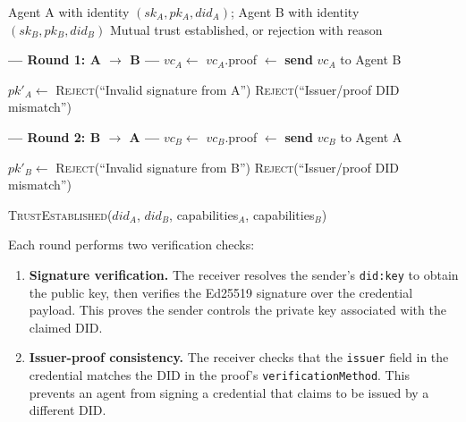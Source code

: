 \documentclass[11pt]{article}
\newcommand{\didkey}{\texttt{did:key}}
\begin{document}
\begin{algorithm}[t]
\caption{Mutual Trust Handshake}
\label{alg:handshake}
\begin{algorithmic}[1]
\Require Agent A with identity $(sk_A, pk_A, did_A)$; Agent B with identity $(sk_B, pk_B, did_B)$
\Ensure Mutual trust established, or rejection with reason

\Statex \textbf{--- Round 1: A $\rightarrow$ B ---}
\State $vc_A \gets$ 
\State $vc_A$.proof $\gets$ 
\State \textbf{send} $vc_A$ to Agent B

\Statex
\State $pk'_A \gets$  
  \State \Return \textsc{Reject}(``Invalid signature from A'')
\EndIf
{}
  \State \Return \textsc{Reject}(``Issuer/proof DID mismatch'')
\EndIf

\Statex \textbf{--- Round 2: B $\rightarrow$ A ---}
\State $vc_B \gets$ 
\State $vc_B$.proof $\gets$ 
\State \textbf{send} $vc_B$ to Agent A

\Statex
\State $pk'_B \gets$ 
  \State \Return \textsc{Reject}(``Invalid signature from B'')
\EndIf
{}
  \State \Return \textsc{Reject}(``Issuer/proof DID mismatch'')
\EndIf

\State \Return \textsc{TrustEstablished}($did_A$, $did_B$, capabilities$_A$, capabilities$_B$)
\end{algorithmic}
\end{algorithm}

Each round performs two verification checks:

\begin{enumerate}[nosep,leftmargin=1.5em]
  \item \textbf{Signature verification.} The receiver resolves the sender's \didkey{} to obtain the public key, then verifies the Ed25519 signature over the credential payload. This proves the sender controls the private key associated with the claimed DID.
  \item \textbf{Issuer-proof consistency.} The receiver checks that the \texttt{issuer} field in the credential matches the DID in the proof's \texttt{verificationMethod}. This prevents an agent from signing a credential that claims to be issued by a different DID.
\end{enumerate}
\end{document}

